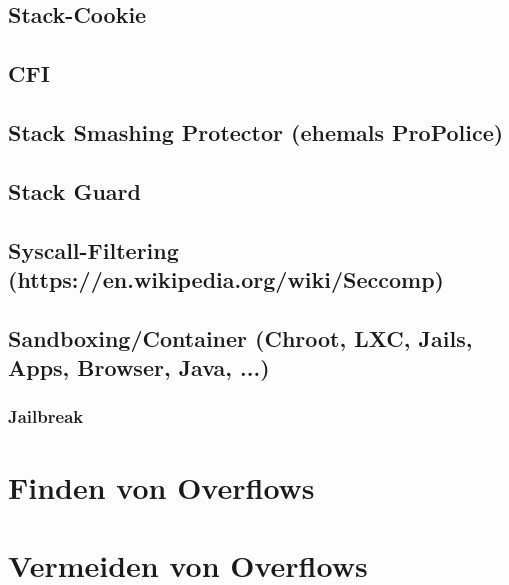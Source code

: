 \documentclass[12pt]{book}
\begin{document}
\section{Stack-Cookie}

\section{CFI}

\section{Stack Smashing Protector (ehemals ProPolice)}

\section{Stack Guard}

\section{Syscall-Filtering (https://en.wikipedia.org/wiki/Seccomp)}

\section{Sandboxing/Container (Chroot, LXC, Jails, Apps, Browser, Java, ...)}

\subsection{Jailbreak}

\chapter{Finden von Overflows}

\chapter{Vermeiden von Overflows}
\end{document}
